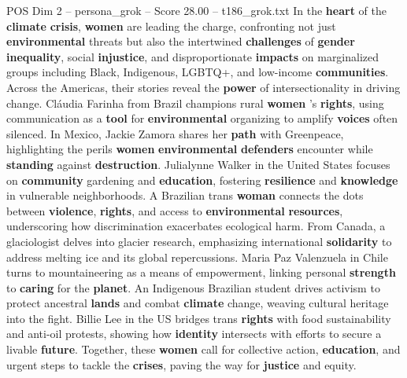 \begin{textsample}{POS Dim 2 – persona\_grok – Score 28.00 – t186\_grok.txt}  \label{ex:f2_pos_033}
In the \textbf{heart} of the \textbf{climate} \textbf{crisis}, \textbf{women} are leading the charge, confronting not just \textbf{environmental} threats but also the intertwined \textbf{challenges} of \textbf{gender} \textbf{inequality}, social \textbf{injustice}, and disproportionate \textbf{impacts} on marginalized groups including Black, Indigenous, LGBTQ+, and low-income \textbf{communities}.
Across the Americas, their stories reveal the \textbf{power} of intersectionality in driving change.
Cláudia Farinha from Brazil champions rural \textbf{women} 's \textbf{rights}, using communication as a \textbf{tool} for \textbf{environmental} organizing to amplify \textbf{voices} often silenced.
In Mexico, Jackie Zamora shares her \textbf{path} with Greenpeace, highlighting the perils \textbf{women} \textbf{environmental} \textbf{defenders} encounter while \textbf{standing} against \textbf{destruction}.
Julialynne Walker in the United States focuses on \textbf{community} gardening and \textbf{education}, fostering \textbf{resilience} and \textbf{knowledge} in vulnerable neighborhoods.
A Brazilian trans \textbf{woman} connects the dots between \textbf{violence}, \textbf{rights}, and access to \textbf{environmental} \textbf{resources}, underscoring how discrimination exacerbates ecological harm.
From Canada, a glaciologist delves into glacier research, emphasizing international \textbf{solidarity} to address melting ice and its global repercussions.
Maria Paz Valenzuela in Chile turns to mountaineering as a means of empowerment, linking personal \textbf{strength} to \textbf{caring} for the \textbf{planet}.
An Indigenous Brazilian student drives activism to protect ancestral \textbf{lands} and combat \textbf{climate} change, weaving cultural heritage into the fight.
Billie Lee in the US bridges trans \textbf{rights} with food sustainability and anti-oil protests, showing how \textbf{identity} intersects with efforts to secure a livable \textbf{future}.
Together, these \textbf{women} call for collective action, \textbf{education}, and urgent steps to tackle the \textbf{crises}, paving the way for \textbf{justice} and equity.

\end{textsample}

